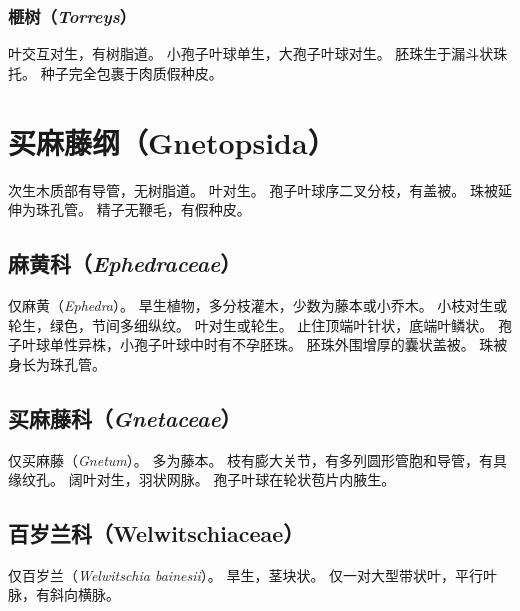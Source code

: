 \documentclass[11pt]{article}
\begin{document}
\begin{sloppypar}
\subsubsection{榧树（\textit{Torreys}）}
叶交互对生，有树脂道。
小孢子叶球单生，大孢子叶球对生。
胚珠生于漏斗状珠托。
种子完全包裹于肉质假种皮。

\section{买麻藤纲（Gnetopsida）}
次生木质部有导管，无树脂道。
叶对生。
孢子叶球序二叉分枝，有盖被。
珠被延伸为珠孔管。
精子无鞭毛，有假种皮。

\subsection{麻黄科（\textit{Ephedraceae}）}
仅麻黄（\textit{Ephedra}）。
旱生植物，多分枝灌木，少数为藤本或小乔木。
小枝对生或轮生，绿色，节间多细纵纹。
叶对生或轮生。
止住顶端叶针状，底端叶鳞状。
孢子叶球单性异株，小孢子叶球中时有不孕胚珠。
胚珠外围增厚的囊状盖被。
珠被身长为珠孔管。

\subsection{买麻藤科（\textit{Gnetaceae}）}
仅买麻藤（\textit{Gnetum}）。
多为藤本。
枝有膨大关节，有多列圆形管胞和导管，有具缘纹孔。
阔叶对生，羽状网脉。
孢子叶球在轮状苞片内腋生。

\subsection{百岁兰科（Welwitschiaceae）}
仅百岁兰（\textit{Welwitschia bainesii}）。
旱生，茎块状。
仅一对大型带状叶，平行叶脉，有斜向横脉。

\end{sloppypar}
\end{document}
